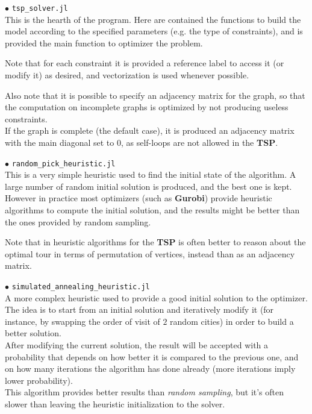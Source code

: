 \documentclass[
12pt,
a4paper,
oneside,
headinclude,
footinclude]{article}
\begin{document}
    $\bullet$ \texttt{tsp\_solver.jl}\\
    This is the hearth of the program. Here are contained the functions to build the model according to the specified parameters (e.g. the type of constraints), and is provided the main function to optimizer the problem.
    
    Note that for each constraint it is provided a reference label to access it (or modify it) as desired, and vectorization is used whenever possible.
    
    Also note that it is possible to specify an adjacency matrix for the graph, so that the computation on incomplete graphs is optimized by not producing useless constraints. \\
    If the graph is complete (the default case), it is produced an adjacency matrix with the main diagonal set to $0$, as self-loops are not allowed in the \textbf{TSP}.
    
    $\bullet$ \texttt{random\_pick\_heuristic.jl}\\
    This is a very simple heuristic used to find the initial state of the algorithm. A large number of random initial solution is produced, and the best one is kept.\\
    However in practice most optimizers (such as \textbf{Gurobi}) provide heuristic algorithms to compute the initial solution, and the results might be better than the ones provided by random sampling.
    
    Note that in heuristic algorithms for the \textbf{TSP} is often better to reason about the optimal tour in terms of permutation of vertices, instead than as an adjacency matrix.
    
    
    $\bullet$ \texttt{simulated\_annealing\_heuristic.jl}\\
    A more complex heuristic used to provide a good initial solution to the optimizer.\\
    The idea is to start from an initial solution and iteratively modify it (for instance, by swapping the order of visit of $2$ random cities) in order to build a better solution.\\
    After modifying the current solution, the result will be accepted with a probability that depends on how better it is compared to the previous one, and on how many iterations the algorithm has done already (more iterations imply lower probability).\\
    This algorithm provides better results than \textit{random sampling}, but it's often slower than leaving the heuristic initialization to the solver. 
    
\end{document}
